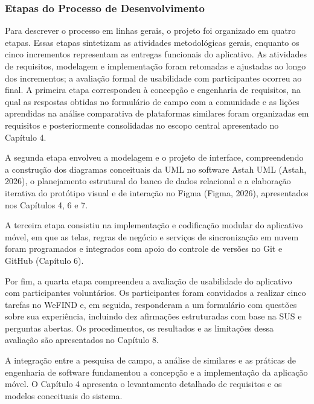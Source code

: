 \subsubsection{Etapas do Processo de Desenvolvimento}

Para descrever o processo em linhas gerais, o projeto foi organizado em quatro etapas. Essas etapas sintetizam as atividades metodológicas gerais, enquanto os cinco incrementos representam as entregas funcionais do aplicativo. As atividades de requisitos, modelagem e implementação foram retomadas e ajustadas ao longo dos incrementos; a avaliação formal de usabilidade com participantes ocorreu ao final. A primeira etapa correspondeu à concepção e engenharia de requisitos, na qual as respostas obtidas no formulário de campo com a comunidade e as lições aprendidas na análise comparativa de plataformas similares foram organizadas em requisitos e posteriormente consolidadas no escopo central apresentado no Capítulo 4.

A segunda etapa envolveu a modelagem e o projeto de interface, compreendendo a construção dos diagramas conceituais da UML no software Astah UML (Astah, 2026), o planejamento estrutural do banco de dados relacional e a elaboração iterativa do protótipo visual e de interação no Figma (Figma, 2026), apresentados nos Capítulos 4, 6 e 7.

A terceira etapa consistiu na implementação e codificação modular do aplicativo móvel, em que as telas, regras de negócio e serviços de sincronização em nuvem foram programados e integrados com apoio do controle de versões no Git e GitHub (Capítulo 6).

Por fim, a quarta etapa compreendeu a avaliação de usabilidade do aplicativo com participantes voluntários. Os participantes foram convidados a realizar cinco tarefas no WeFIND e, em seguida, responderam a um formulário com questões sobre sua experiência, incluindo dez afirmações estruturadas com base na SUS e perguntas abertas. Os procedimentos, os resultados e as limitações dessa avaliação são apresentados no Capítulo 8.

A integração entre a pesquisa de campo, a análise de similares e as práticas de engenharia de software fundamentou a concepção e a implementação da aplicação móvel. O Capítulo 4 apresenta o levantamento detalhado de requisitos e os modelos conceituais do sistema.
